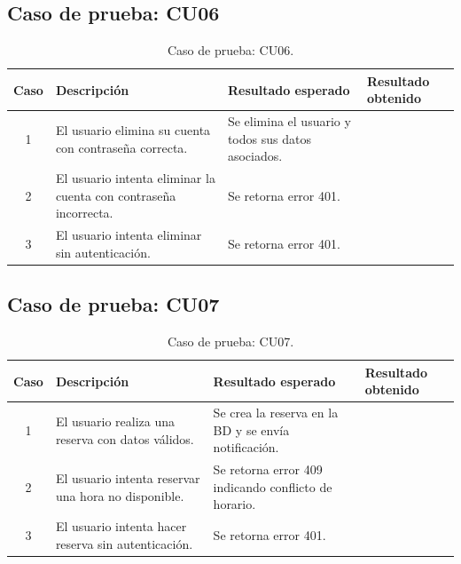 
\subsection{Caso de prueba: CU06}

\begin{table}[H]
\centering
\label{tab:cu06_white_test}
\renewcommand{\arraystretch}{1.3}
\begin{tabular}{|c|p{5cm}|p{6cm}|p{2.5cm}|}
\hline
\rowcolor[RGB]{217,217,217}
\textbf{Caso} & \textbf{Descripción} & \textbf{Resultado esperado} & \textbf{Resultado obtenido} \\
\hline

1 &
El usuario elimina su cuenta con contraseña correcta. &
Se elimina el usuario y todos sus datos asociados. &
 \\
\hline

2 &
El usuario intenta eliminar la cuenta con contraseña incorrecta. &
Se retorna error 401. &
 \\
\hline

3 &
El usuario intenta eliminar sin autenticación. &
Se retorna error 401. &
 \\
\hline

\end{tabular}
\caption{Caso de prueba: CU06.}
\end{table}


\subsection{Caso de prueba: CU07}

\begin{table}[H]
\centering
\label{tab:cu07_white_test}
\renewcommand{\arraystretch}{1.3}
\begin{tabular}{|c|p{5cm}|p{6cm}|p{2.5cm}|}
\hline
\rowcolor[RGB]{217,217,217}
\textbf{Caso} & \textbf{Descripción} & \textbf{Resultado esperado} & \textbf{Resultado obtenido} \\
\hline

1 &
El usuario realiza una reserva con datos válidos. &
Se crea la reserva en la BD y se envía notificación. &
 \\
\hline

2 &
El usuario intenta reservar una hora no disponible. &
Se retorna error 409 indicando conflicto de horario. &
 \\
\hline

3 &
El usuario intenta hacer reserva sin autenticación. &
Se retorna error 401. &
 \\
\hline

\end{tabular}
\caption{Caso de prueba: CU07.}
\end{table}

